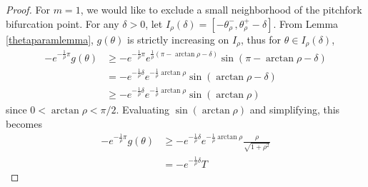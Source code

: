 \documentclass[thesis.tex]{subfiles}
\begin{document}
\begin{lemma}
\begin{proof}
For $m = 1$, we would like to exclude a small neighborhood of the pitchfork bifurcation point. For any $\delta > 0$, let $I_\rho(\delta) = [-\theta_\rho^-, \theta_\rho^+ - \delta]$. From Lemma \ref{thetaparamlemma}, $g(\theta)$ is strictly increasing on $I_\rho$, thus for $\theta \in I_\rho(\delta)$,
\begin{align*}
-e^{ -\frac{1}{\rho} \pi } g(\theta) &\geq 
 -e^{ -\frac{1}{\rho} \pi } e^{ \frac{1}{\rho}(\pi - \arctan \rho - \delta) } \sin(\pi - \arctan \rho - \delta) \\
&= -e^{-\frac{1}{\rho}\delta} e^{-\frac{1}{\rho}\arctan\rho}\sin(\arctan \rho - \delta) \\
&\geq -e^{-\frac{1}{\rho}\delta} e^{-\frac{1}{\rho}\arctan\rho}\sin(\arctan \rho)
\end{align*}
since $0 < \arctan \rho < \pi/2$. Evaluating $\sin(\arctan\rho)$ and simplifying, this becomes
\begin{align*}
-e^{ -\frac{1}{\rho} \pi } g(\theta)
&\geq -e^{-\frac{1}{\rho}\delta} e^{-\frac{1}{\rho}\arctan\rho}\frac{\rho}{\sqrt{1 + \rho^2}} \\
&= -e^{-\frac{1}{\rho}\delta} T
\end{align*}


\end{proof}
\end{lemma}
\end{document}
